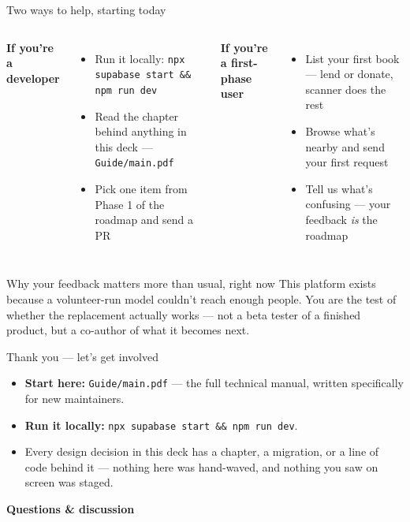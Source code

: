 \documentclass[aspectratio=169,11pt]{beamer}
\newcommand{\code}[1]{\textcolor{olkTealDark}{\texttt{#1}}}
\begin{document}
\begin{frame}{Two ways to help, starting today}
  \begin{columns}[T]
    \textbf{If you're a developer}
    \begin{itemize}
      \item Run it locally: \code{npx supabase start \&\& npm run dev}
      \item Read the chapter behind anything in this deck --- \code{Guide/main.pdf}
      \item Pick one item from Phase 1 of the roadmap and send a PR
    \end{itemize}
    \textbf{If you're a first-phase user}
    \begin{itemize}
      \item List your first book --- lend or donate, scanner does the rest
      \item Browse what's nearby and send your first request
      \item Tell us what's confusing --- your feedback \emph{is} the roadmap
    \end{itemize}
  \end{columns}
  \vfill
  \begin{alertblock}{Why your feedback matters more than usual, right now}
    This platform exists because a volunteer-run model couldn't reach enough people. You are the test of whether the replacement actually works --- not a beta tester of a finished product, but a co-author of what it becomes next.
  \end{alertblock}
\end{frame}

\begin{frame}{Thank you --- let's get involved}
  \begin{itemize}
    \item \textbf{Start here:} \code{Guide/main.pdf} --- the full technical manual, written specifically for new maintainers.
    \item \textbf{Run it locally:} \code{npx supabase start \&\& npm run dev}.
    \item Every design decision in this deck has a chapter, a migration, or a line of code behind it --- nothing here was hand-waved, and nothing you saw on screen was staged.
  \end{itemize}
  \vfill
  \begin{center}
    \Large\textbf{Questions \& discussion}
  \end{center}
\end{frame}
\end{document}
